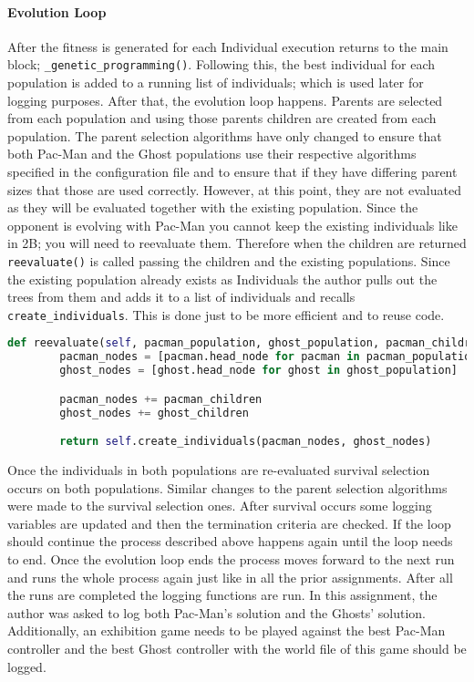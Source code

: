 \paragraph{Evolution Loop}

After the fitness is generated for each Individual execution returns to the main block; \texttt{\_genetic\_programming()}.
Following this, the best individual for each population is added to a running list of individuals; which is used later for logging purposes.
After that, the evolution loop happens.
Parents are selected from each population and using those parents children are created from each population.
The parent selection algorithms have only changed to ensure that both Pac-Man and the Ghost populations use their respective algorithms specified in the configuration file and to ensure that if they have differing parent sizes that those are used correctly.
However, at this point, they are not evaluated as they will be evaluated together with the existing population.
Since the opponent is evolving with Pac-Man you cannot keep the existing individuals like in 2B; you will need to reevaluate them.
Therefore when the children are returned \texttt{reevaluate()} is called passing the children and the existing populations.
Since the existing population already exists as Individuals the author pulls out the trees from them and adds it to a list of individuals and recalls \texttt{create\_individuals}.
This is done just to be more efficient and to reuse code. 

\begin{lstlisting}[language=Python]
    def reevaluate(self, pacman_population, ghost_population, pacman_children, ghost_children):
        pacman_nodes = [pacman.head_node for pacman in pacman_population]
        ghost_nodes = [ghost.head_node for ghost in ghost_population]

        pacman_nodes += pacman_children
        ghost_nodes += ghost_children

        return self.create_individuals(pacman_nodes, ghost_nodes)
\end{lstlisting}

Once the individuals in both populations are re-evaluated survival selection occurs on both populations.
Similar changes to the parent selection algorithms were made to the survival selection ones.
After survival occurs some logging variables are updated and then the termination criteria are checked. 
If the loop should continue the process described above happens again until the loop needs to end.
Once the evolution loop ends the process moves forward to the next run and runs the whole process again just like in all the prior assignments.
After all the runs are completed the logging functions are run.
In this assignment, the author was asked to log both Pac-Man's solution and the Ghosts' solution.
Additionally, an exhibition game needs to be played against the best Pac-Man controller and the best Ghost controller with the world file of this game should be logged.

